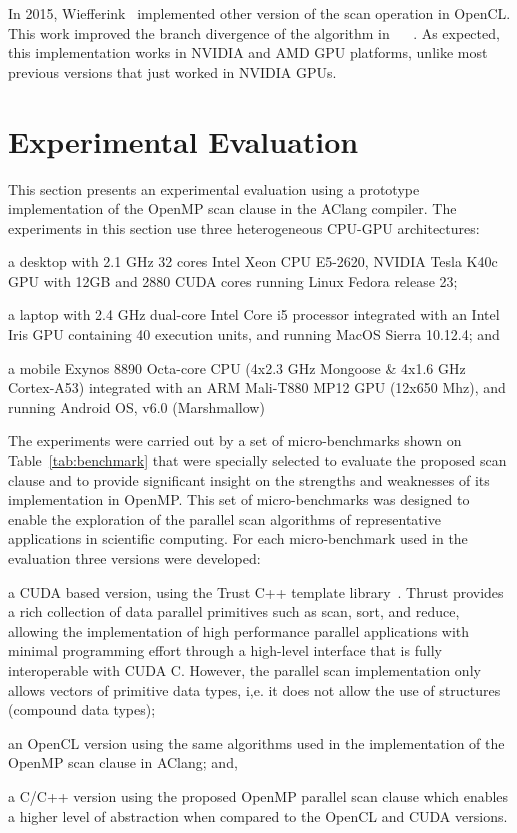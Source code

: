 \documentclass[Ingles]{ic-tese-v1}
\begin{document}
In 2015, Wiefferink~\cite{ScanOpenCL} implemented other version of the
scan operation in OpenCL.  This work improved the branch divergence of
the  algorithm in  ~\cite{ScanAsPrimitive} ~\cite{harris2007parallel}.
As  expected,  this  implementation  works   in  NVIDIA  and  AMD  GPU
platforms, unlike  most previous versions  that just worked  in NVIDIA
GPUs.


\chapter{Experimental Evaluation}
\label{cap:Experiments}

This  section presents  an experimental  evaluation using  a prototype
implementation of  the OpenMP scan  clause in the AClang compiler.
The  experiments in this section  use  three   heterogeneous  CPU-GPU
architectures:
\begin{inparaenum}[(i)\upshape]
	\item a desktop with 2.1 GHz 32 cores Intel Xeon CPU E5-2620,
	NVIDIA Tesla K40c GPU with 12GB and 2880 CUDA cores  running
	Linux Fedora  release 23;
	\item  a  laptop  with  2.4  GHz dual-core  Intel  Core  i5  processor
	integrated with an Intel Iris GPU containing 40 execution units, and
	running MacOS Sierra 10.12.4; and
	\item a mobile  Exynos 8890 Octa-core  CPU (4x2.3 GHz Mongoose  \& 4x1.6
	GHz Cortex-A53)  integrated with an  ARM Mali-T880 MP12  GPU (12x650
	Mhz), and running Android OS, v6.0 (Marshmallow)
\end{inparaenum}

The experiments were carried out by a set of micro-benchmarks 
shown on  Table~\ref{tab:benchmark} that were specially selected to  evaluate 
the  proposed scan clause  and to  provide significant
insight on the strengths and weaknesses of its  implementation in OpenMP.
This set of  micro-benchmarks was designed to  enable the exploration
of  the  parallel scan  algorithms  of  representative applications  in
scientific computing.  For each micro-benchmark  used  in   the  evaluation  
three  versions  were developed:
\begin{inparaenum}[(i)\upshape]
	\item a CUDA based version, using the Trust C++ template library~\cite{trust}.
	Thrust provides a  rich collection of data  parallel primitives such
	as scan,  sort, and reduce,  allowing the implementation of  high performance
	parallel  applications with  minimal  programming  effort through  a
	high-level  interface   that  is   fully  interoperable   with  CUDA
	C. However, the parallel scan  implementation only allows vectors of
	primitive  data  types, i,e.   it  does  not  allow the  use  of
	structures (compound data types);
	\item an  OpenCL version using the same algorithms used in the
	implementation of the OpenMP scan clause in AClang; and,
	\item a C/C++ version using the proposed OpenMP parallel scan clause
	which enables a  higher level of abstraction when compared to the OpenCL and
	CUDA versions.
\end{inparaenum}
\end{document}

